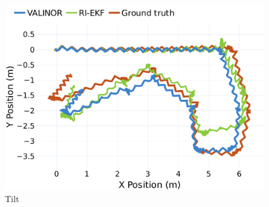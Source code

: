 \documentclass{IJCAS}
\begin{document}
\begin{figure}[!t]
\begin{center}
\includegraphics[width=\columnwidth]{Uploaded/Images/trajectory_rhps1.pdf} 
\vskip -0.5pc
\caption{Tilt}\label{fig:trajRhps1_3d}
\end{center}
\vskip -1.5pc
\end{figure}
\end{document}
